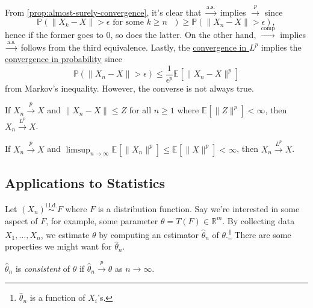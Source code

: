 From \autoref{prop:almost-surely-convergence}, it's clear that \(\overset{\text{a.s.} }{\to } \) implies \(\overset{p}{\to } \) since
\[
	\mathbb{P} (\lVert X_k - X \rVert > \epsilon \text{ for some \(k \geq n\) } )
	\geq \mathbb{P} (\lVert X_n - X \rVert > \epsilon ),
\]
hence if the former goes to \(0\), so does the latter. On the other hand, \(\overset{\text{comp} }{\to } \) implies \(\overset{\text{a.s.} }{\to } \) follows from the third equivalence. Lastly, the \hyperref[def:converge-in-Lp]{convergence in \(L^p\)} implies the \hyperref[def:converge-in-probability]{convergence in probability} since
\[
	\mathbb{P} (\lVert X_n - X \rVert > \epsilon )
	\leq \frac{1}{\epsilon ^p} \mathbb{E}_{}\left[\lVert X_n - X \rVert ^p \right]
\]
from Markov's inequality. However, the converse is not always true.

\begin{theorem}\label{thm:DCT}
	If \(X_n \overset{p}{\to } X\) and \(\lVert X_n - X \rVert \leq Z\) for all \(n \geq 1\) where \(\mathbb{E}_{}\left[\lVert Z \rVert ^p \right] < \infty \), then \(X_n \overset{L^p}{\to } X\).
\end{theorem}

\begin{theorem}\label{thm:Scheffe}
	If \(X_n \overset{p}{\to } X\) and \(\limsup_{n \to \infty} \mathbb{E}_{}\left[\lVert X_n \rVert ^p \right] \leq \mathbb{E}_{}\left[\lVert X \rVert ^p \right] < \infty \), then \(X_n \overset{L^p}{\to } X\).
\end{theorem}

\subsection{Applications to Statistics}
Let \((X_n) \overset{\text{i.i.d.} }{\sim } F\) where \(F\) is a distribution function. Say we're interested in some aspect of \(F\), for example, some parameter \(\theta = T(F) \in \mathbb{R} ^m\). By collecting data \(X_1, \dots , X_n\), we estimate \(\theta \) by computing an estimator \(\hat{\theta} _n\) of \(\theta \).\footnote{\(\hat{\theta} _n\) is a function of \(X_i\)'s.} There are some properties we might want for \(\hat{\theta} _n\).

\begin{definition}[Consistent]\label{def:consistent}
	\(\hat{\theta} _n\) is \emph{consistent} of \(\theta \) if \(\hat{\theta} _n \overset{p}{\to } \theta \) as \(n \to \infty \).
\end{definition}

